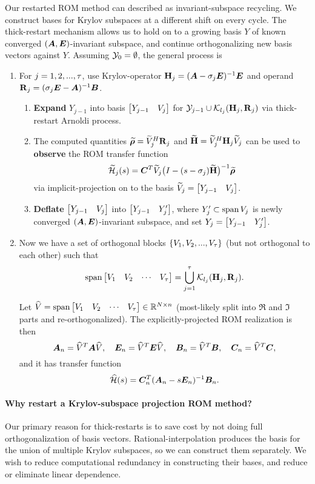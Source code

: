 Our restarted ROM method can described as invariant-subspace recycling.   We construct bases for Krylov subspaces at a different shift on every cycle.  The thick-restart mechanism allows us to hold on to a growing basis $Y$ of known converged $(\bm{A},\bm{E})$-invariant subspace, and continue orthogonalizing new basis vectors against $Y$.  Assuming $\mathcal{Y}_0 = \emptyset$, the general process is 
\begin{enumerate}
\item For $j=1,2,...,\tau$, use Krylov-operator $\textbf{\textup{H}}_j = (\bm{A}-\sigma_j \bm{E})^{-1}\bm{E}$ and operand $\textbf{\textup{R}}_j= (\sigma_j \bm{E} - \bm{A})^{-1}\bm{B}$. 
\begin{enumerate}
\item \textbf{Expand} $Y_{j-1}$ into basis $\begin{bmatrix} Y_{j-1} & V_j\end{bmatrix}$ for $\mathcal{Y}_{j-1} \cup \mathcal{K}_{l_j}({\textbf{\textup{H}}_j},{\textbf{\textup{R}}_j})$ via thick-restart Arnoldi process.  

\item  The computed quantities $\widetilde{\boldsymbol{\rho}} =\widetilde{V}_j^H \textbf{\textup{R}}_j$ and $\widetilde{\textbf{\textup{H}}} = \widetilde{V}_j^H \textbf{\textup{H}}_j \widetilde{V}_j$ can be used to \textbf{observe} the ROM transfer function 
\[
\widetilde{\mathcal{H}}_j(s)=\bm{C}^T \widetilde{V}_j \big( I - (s-\sigma_j) \widetilde{\textbf{\textup{H}}} \big)^{-1} \widetilde{\boldsymbol{\rho}}
\]
 via implicit-projection on to the basis $\widetilde{V}_j = \begin{bmatrix} Y_{j-1} & V_j\end{bmatrix}$.

\item \textbf{Deflate} $\begin{bmatrix} Y_{j-1} & V_j\end{bmatrix}$ into $\begin{bmatrix} Y_{j-1} &Y^\prime_j\end{bmatrix}$, where       $Y^\prime_j\subset\operatorname*{span} V_j$ is newly converged $(\bm{A},\bm{E})$-invariant subspace, and set $Y_j = \begin{bmatrix} Y_{j-1} &Y^\prime_j\end{bmatrix}$. 
\end{enumerate}

\item Now we have a set of orthogonal blocks $\{ V_1, V_2, ...,V_\tau\}$ (but not orthogonal to each other) such that 
\[
\operatorname*{span} \begin{bmatrix} V_1& V_2& \cdots&V_\tau\end{bmatrix} = \bigcup_{j=1}^\tau \mathcal{K}_{l_j}({\textbf{\textup{H}}_j},{\textbf{\textup{R}}_j}).
\] 

Let $\widehat{V} = \operatorname*{span}\begin{bmatrix} V_1& V_2& \cdots&V_\tau\end{bmatrix}\in\mathbb{R}^{N\times n}$  (most-likely split into $\Re$ and $\Im$ parts and re-orthogonalized). The explicitly-projected ROM realization is then 
\[
\bm{A}_n = \widehat{V}^T \bm{A} \widehat{V},\quad 
\bm{E}_n = \widehat{V}^T \bm{E} \widehat{V}, \quad
\bm{B}_n = \widehat{V}^T \bm{B},\quad
\bm{C}_n = \widehat{V}^T \bm{C},
\]
and it has transfer function 
\[
\widehat{\mathcal{H}}(s) = \bm{C}_n^T (\bm{A}_n - s \bm{E}_n )^{-1} \bm{B}_n. 
\]
\end{enumerate}




\paragraph{Why restart a Krylov-subspace projection ROM method?}
Our primary reason for thick-restarts is to save cost by not doing full orthogonalization of basis vectors.  Rational-interpolation produces the basis for the union of multiple Krylov subspaces, so we can construct them separately.  We wish to reduce computational redundancy in constructing their bases, and reduce or eliminate linear dependence.  

